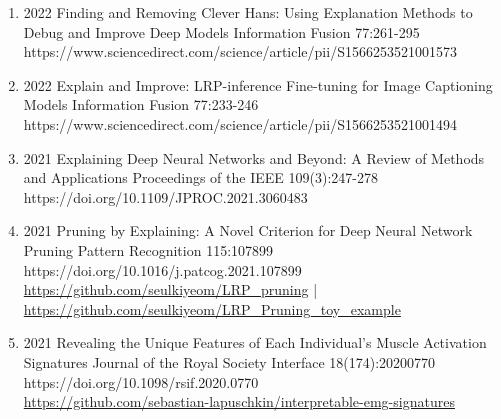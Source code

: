 \documentclass[10pt,a4paper]{article} %
\begin{document}
{\begin{enumerate}
    \item {}
                        {2022}
                        {Finding and Removing Clever Hans: Using Explanation Methods to Debug and Improve Deep Models}
                        {Information Fusion}
                        {77:261-295}
                        {https://www.sciencedirect.com/science/article/pii/S1566253521001573}


    \item {}
                       {2022}
                       {Explain and Improve: LRP-inference Fine-tuning for Image Captioning Models}
                       {Information Fusion}
                       {77:233-246}
                       {https://www.sciencedirect.com/science/article/pii/S1566253521001494}

    \item {}
                        {2021}
                        {Explaining Deep Neural Networks and Beyond: A Review of Methods and Applications}
                        {Proceedings of the IEEE}
                        {109(3):247-278}
                        {https://doi.org/10.1109/JPROC.2021.3060483}

    \item {}
                        {2021}
                        {Pruning by Explaining: A Novel Criterion for Deep Neural Network Pruning}
                        {Pattern Recognition}
                        {115:107899}
                        {https://doi.org/10.1016/j.patcog.2021.107899}
                        {\\\href{https://github.com/seulkiyeom/LRP_pruning}{https://github.com/seulkiyeom/LRP\_pruning}
                         | \href{https://github.com/seulkiyeom/LRP_Pruning_toy_example}{https://github.com/seulkiyeom/LRP\_Pruning\_toy\_example}}

    \item {}
                        {2021}
                        {Revealing the Unique Features of Each Individual's Muscle Activation Signatures}
                        {Journal of the Royal Society Interface}
                        {18(174):20200770}
                        {https://doi.org/10.1098/rsif.2020.0770}
                        {\\\href{https://github.com/sebastian-lapuschkin/interpretable-emg-signatures}{https://github.com/sebastian-lapuschkin/interpretable-emg-signatures}}


\end{enumerate}}
\end{document}
